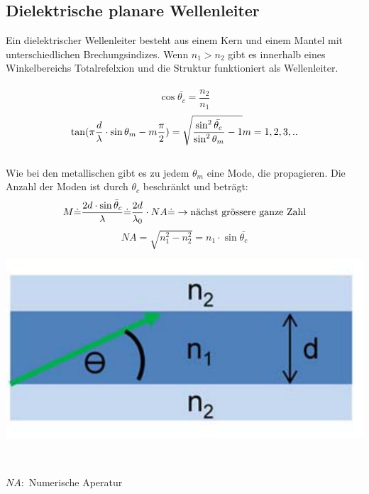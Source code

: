 \subsection{Dielektrische planare Wellenleiter}
Ein dielektrischer Wellenleiter besteht aus einem Kern und einem Mantel mit unterschiedlichen Brechungsindizes. Wenn \textbf{$n_1>n_2$} gibt es innerhalb eines Winkelbereichs Totalrefelxion und die Struktur funktioniert als Wellenleiter.\\
\\
\[
	\cos \bar{\theta_c}=\frac{n_2}{n_1}
\]
\[
	\tan (\pi \frac d\lambda \cdot\sin \theta_m-m\frac{\pi}{2})=
	\sqrt{\frac{\sin^2 \bar{\theta_c}}{\sin^2\theta_m}-1} \\
	m=1,2,3,.. 
\]
\\
Wie bei den metallischen gibt es zu jedem $\theta_m$ eine Mode, die propagieren. Die Anzahl der Moden ist durch $\theta_c$ beschränkt und beträgt: \\
\[
	M \dot{=} \frac{2d\cdot\sin \bar{\theta}_c}{\lambda} \\
	\dot{=}\frac{2d}{\lambda_0}\cdot NA\\ \\ \\ \\
	\dot{=}\rightarrow \text{nächst grössere ganze Zahl}
\] 
\[
	NA=\sqrt{n_1^2-n_2^2}=n_1\cdot \sin \bar{\theta_c}
\]
\begin{center}
	\includegraphics[scale = 0.2]{images/dielektrische_WL.jpg}
\end{center}
\
\begin{footnotesize}
	$NA:$	Numerische Aperatur \\
\end{footnotesize}
\
\\
